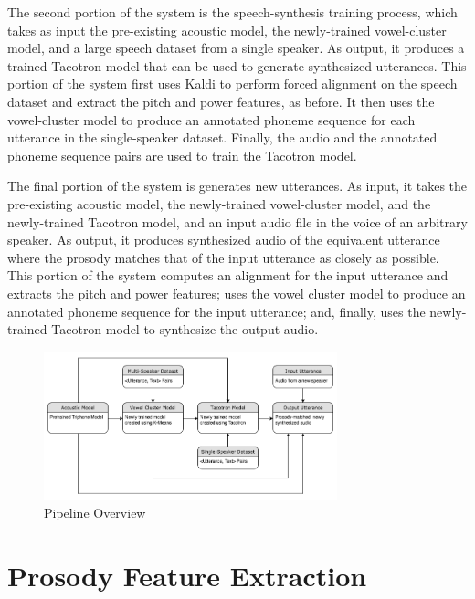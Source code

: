 \documentclass{article}
\begin{document}
The second portion of the system is the speech-synthesis training process, which takes as input the pre-existing acoustic model, the newly-trained vowel-cluster model, and a large speech dataset from a single speaker. As output, it produces a trained Tacotron model that can be used to generate synthesized utterances. This portion of the system first uses Kaldi to perform forced alignment on the speech dataset and extract the pitch and power features, as before. It then uses the vowel-cluster model to produce an annotated phoneme sequence for each utterance in the single-speaker dataset. Finally, the audio and the annotated phoneme sequence pairs are used to train the Tacotron model.

The final portion of the system is generates new utterances. As input, it takes the pre-existing acoustic model, the newly-trained vowel-cluster model, and the newly-trained Tacotron model, and an input audio file in the voice of an arbitrary speaker. As output, it produces synthesized audio of the equivalent utterance where the prosody matches that of the input utterance as closely as possible. This portion of the system computes an alignment for the input utterance and extracts the pitch and power features; uses the vowel cluster model to produce an annotated phoneme sequence for the input utterance; and, finally, uses the newly-trained Tacotron model to synthesize the output audio.

\begin{figure}[htb]

\begin{minipage}[b]{1.0\linewidth}
  \centering
  \centerline{\includegraphics[width=8.5cm]{Overall_Pipeline}}
\end{minipage}
\caption{Pipeline Overview}
\label{fig:overview}
\end{figure}

\section{Prosody Feature Extraction}
\label{sec:prosody}
\end{document}
